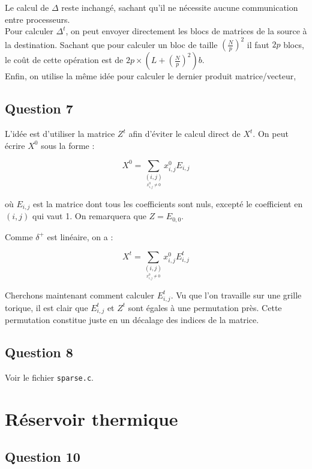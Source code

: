 \documentclass{article}
\begin{document}
Le calcul de $\Delta$ reste inchangé, sachant qu'il ne nécessite aucune communication entre processeurs. \\

Pour calculer $\Delta^t$, on peut envoyer directement les blocs de matrices de la source à la destination. Sachant que pour calculer un bloc de taille ${\left( \frac{N}{p} \right)}^2$ il faut $2p$ blocs, le coût de cette opération est de $2p \times \left( L + {\left( \frac{N}{p} \right)}^2 \right) b$. \\

Enfin, on utilise la même idée pour calculer le dernier produit matrice/vecteur, 

\subsection*{Question 7}

L'idée est d'utiliser la matrice $Z^t$ afin d'éviter le calcul direct de $X^t$. On peut écrire $X^0$ sous la forme : 

$$ X^0 = \sum_{\underset{x^0_{i,j} \neq 0}{(i,j)}} x^0_{i,j}E_{i,j} $$

où $E_{i,j}$ est la matrice dont tous les coefficients sont nuls, excepté le coefficient en $(i,j)$ qui vaut 1. On remarquera que $Z = E_{0,0}$.

Comme $\delta^+$ est linéaire, on a :

$$ X^t = \sum_{\underset{x^0_{i,j} \neq 0}{(i,j)}} x^0_{i,j}E_{i,j}^t $$

Cherchons maintenant comment calculer $E_{i,j}^t$. Vu que l'on travaille sur une grille torique, il est clair que $E_{i,j}^t$ et $Z^t$ sont égales à une permutation près. Cette permutation constitue juste en un décalage des indices de la matrice. 


\subsection*{Question 8}

Voir le fichier \texttt{sparse.c}.

\section{Réservoir thermique}

\subsection*{Question 10}
\end{document}
